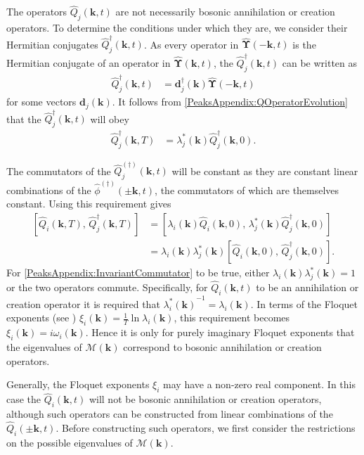 The operators $\hat{Q}_j(\bm{k}, t)$ are not necessarily bosonic annihilation or creation operators. To determine the conditions under which they are, we consider their Hermitian conjugates $\hat{Q}_j^\dagger(\bm{k}, t)$. As every operator in $\hat{\bm{\Upsilon}}(-\bm{k}, t)$ is the Hermitian conjugate of an operator in $\hat{\bm{\Upsilon}}(\bm{k}, t)$, the $\hat{Q}_j^\dagger(\bm{k}, t)$ can be written as
\begin{align}
    \label{PeaksAppendix:QDaggerDefinition}
    \hat{Q}_j^\dagger(\bm{k}, t) &= \bm{d}_j^\dagger(\bm{k}) \hat{\bm{\Upsilon}}(-\bm{k}, t)
\end{align}
for some vectors $\bm{d}_j(\bm{k})$. It follows from \eqref{PeaksAppendix:QOperatorEvolution} that the $\hat{Q}_j^\dagger(\bm{k}, t)$ will obey
\begin{align}
    \label{PeaksAppendix:QDaggerEvolution}
    \hat{Q}_j^\dagger(\bm{k}, T) &= \lambda_j^*(\bm{k}) \hat{Q}_j^\dagger(\bm{k}, 0).
\end{align}

The commutators of the $\hat{Q}_j^{(\dagger)}(\bm{k}, t)$ will be constant as they are constant linear combinations of the $\hat{\phi}^{(\dagger)}(\pm\bm{k}, t)$, the commutators of which are themselves constant. Using this requirement gives
\begin{align}
    \left[ \hat{Q}_i(\bm{k}, T),\, \hat{Q}_j^\dagger(\bm{k}, T) \right] &= \left[ \lambda_i(\bm{k}) \hat{Q}_i(\bm{k}, 0),\, \lambda_j^*(\bm{k}) \hat{Q}_j^\dagger(\bm{k}, 0)\right]\\
        &= \lambda_i(\bm{k}) \lambda_j^*(\bm{k}) \left[ \hat{Q}_i(\bm{k}, 0),\, \hat{Q}_j^\dagger(\bm{k}, 0)\right].
        \label{PeaksAppendix:InvariantCommutator}
\end{align}
For \eqref{PeaksAppendix:InvariantCommutator} to be true, either $\lambda_i(\bm{k}) \lambda_j^*(\bm{k}) = 1$ or the two operators commute. Specifically, for $\hat{Q}_i(\bm{k}, t)$ to be an annihilation or creation operator it is required that ${\lambda_i^*(\bm{k})}^{-1} = \lambda_i(\bm{k})$. In terms of the Floquet exponents (see ) $\displaystyle \xi_i(\bm{k}) = \frac{1}{T} \ln \lambda_i(\bm{k})$, this requirement becomes $\xi_i(\bm{k}) = i \omega_i(\bm{k})$. Hence it is only for purely imaginary Floquet exponents that the eigenvalues of $\mathcal{M}(\bm{k})$ correspond to bosonic annihilation or creation operators.

Generally, the Floquet exponents $\xi_i$ may have a non-zero real component. In this case the $\hat{Q}_i(\bm{k}, t)$ will not be bosonic annihilation or creation operators, although such operators can be constructed from linear combinations of the $\hat{Q}_i(\pm\bm{k}, t)$. Before constructing such operators, we first consider the restrictions on the possible eigenvalues of $\mathcal{M}(\bm{k})$.

